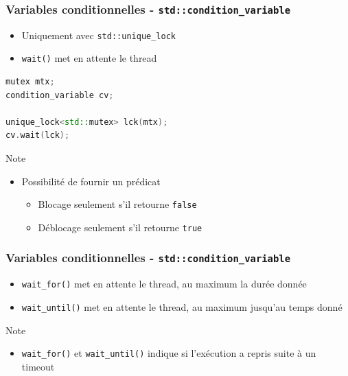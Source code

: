 \documentclass[C++.tex]{subfiles}
\begin{document}
\begin{frame}[fragile]
	\frametitle{Variables conditionnelles - \lstinline|std::condition_variable|}
	\begin{itemize}
		\item Uniquement avec \lstinline|std::unique_lock|
		\item \lstinline|wait()| met en attente le thread
	\end{itemize}

	\begin{lstlisting}[language=C++]
mutex mtx;
condition_variable cv;

unique_lock<std::mutex> lck(mtx);
cv.wait(lck);\end{lstlisting}

	\begin{block}{Note}
		\begin{itemize}
			\item Possibilité de fournir un prédicat
			\begin{itemize}
				\item Blocage seulement s'il retourne \lstinline|false|
				\item Déblocage seulement s'il retourne \lstinline|true|
			\end{itemize}
		\end{itemize}
	\end{block}
\end{frame}

\begin{frame}[fragile]
	\frametitle{Variables conditionnelles - \lstinline|std::condition_variable|}
	\begin{itemize}
		\item \lstinline|wait_for()| met en attente le thread, au maximum la durée donnée
		\item \lstinline|wait_until()| met en attente le thread, au maximum jusqu'au temps donné
	\end{itemize}

	\begin{block}{Note}
		\begin{itemize}
			\item \lstinline|wait_for()| et \lstinline|wait_until()| indique si l'exécution a repris suite à un timeout
		\end{itemize}
	\end{block}
\end{frame}
\end{document}

